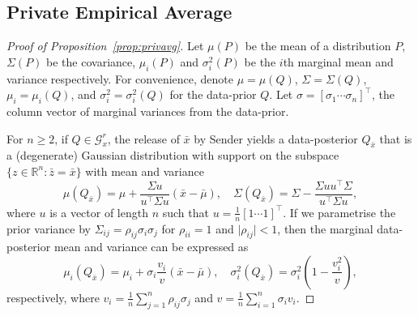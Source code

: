 \documentclass{article}
\theoremstyle{plain}
\theoremstyle{plain}
\theoremstyle{definition}
\theoremstyle{remark}
\theoremstyle{plain}
\begin{document}
\subsection{Private Empirical Average}\label{proof:privavg}
\begin{proof}[Proof of Proposition~\ref{prop:privavg}]
    Let $\mu(P)$ be the mean of a distribution $P$, $\Sigma(P)$ be the covariance, $\mu_i(P)$ and $\sigma_i^2(P)$ be the $i$th marginal mean and variance respectively. For convenience, denote $\mu = \mu(Q)$, $\Sigma = \Sigma(Q)$,  $\mu_i = \mu_i(Q)$, and $\sigma_i^2 = \sigma_i^2(Q)$ for the data-prior $Q$. Let $\sigma = [\sigma_1\cdots\sigma_n]^\top$, the column vector of marginal variances from the data-prior.
    
    For $n\geq 2$, if $Q \in \mathcal{G}_{x}^{r}$, the release of $\bar{x}$  by Sender yields a data-posterior $Q_{\bar{x}}$ that is a (degenerate) Gaussian distribution with support on the subspace $\{z \in \mathbb{R}^n:\bar{z}=\bar{x}\}$ with mean and variance
    \begin{equation*}
        \mu(Q_{\bar{x}})=\mu + \frac{\Sigma u}{u^\top \Sigma u}(\bar{x} - \bar{\mu}), \quad \Sigma(Q_{\bar{x}}) = \Sigma - \frac{\Sigma u u^\top \Sigma}{u^\top \Sigma u},
    \end{equation*}
    where $u$ is a vector of length $n$ such that $u = \frac{1}{n}[1\cdots1]^\top$. If we parametrise the prior variance by $\Sigma_{ij} = \rho_{ij}\sigma_i\sigma_j$ for $\rho_{ii}=1$ and $\vert\rho_{ij}\vert<1$, then the marginal data-posterior mean and variance can be expressed as
    \begin{equation*}
            \mu_i(Q_{\bar{x}})=\mu_i + \sigma_i\frac{v_i}{v}(\bar{x} - \bar{\mu}), \quad \sigma_i^2(Q_{\bar{x}}) = \sigma_i^2\left(1 - \frac{v_i^2}{v}\right),
    \end{equation*}
    respectively, where $v_i = \frac{1}{n}\sum_{j=1}^n \rho_{ij}\sigma_j$ and $v = \frac{1}{n}\sum_{i=1}^{n}\sigma_i v_i$.


\end{proof}
\end{document}
